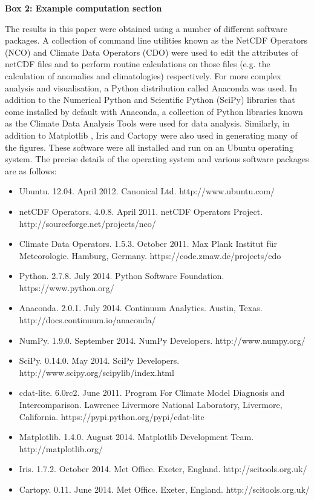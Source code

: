 \textbf{Box 2: Example computation section}

The results in this paper were obtained using a number of different software packages. A collection of command line utilities known as the NetCDF Operators (NCO) and Climate Data Operators (CDO) were used to edit the attributes of netCDF files and to perform routine calculations on those files (e.g. the calculation of anomalies and climatologies) respectively. For more complex analysis and visualisation, a Python distribution called Anaconda was used. In addition to the Numerical Python \citep[NumPy;][]{VanDerWalt2011} and Scientific Python (SciPy) libraries that come installed by default with Anaconda, a collection of Python libraries known as the Climate Data Analysis Tools \citep[CDAT;][]{Doutriaux2009} were used for data analysis. Similarly, in addition to Matplotlib \citep[the default Python plotting library;][]{Hunter2007}, Iris and Cartopy were also used in generating many of the figures. These software were all installed and run on an Ubuntu operating system. The precise details of the operating system and various software packages are as follows:
\begin{itemize}
\item Ubuntu. 12.04. April 2012. Canonical Ltd. http://www.ubuntu.com/
\item netCDF Operators. 4.0.8. April 2011. netCDF Operators Project. http://sourceforge.net/projects/nco/
\item Climate Data Operators. 1.5.3. October 2011. Max Plank Institut f{\"u}r Meteorologie. Hamburg, Germany. https://code.zmaw.de/projects/cdo
\item Python. 2.7.8. July 2014. Python Software Foundation. https://www.python.org/
\item Anaconda. 2.0.1. July 2014. Continuum Analytics. Austin, Texas. http://docs.continuum.io/anaconda/
\item NumPy. 1.9.0. September 2014. NumPy Developers. http://www.numpy.org/
\item SciPy. 0.14.0. May 2014. SciPy Developers. http://www.scipy.org/scipylib/index.html
\item cdat-lite. 6.0rc2. June 2011. Program For Climate Model Diagnosis and Intercomparison. Lawrence Livermore National Laboratory, Livermore, California. https://pypi.python.org/pypi/cdat-lite
\item Matplotlib. 1.4.0. August 2014. Matplotlib Development Team. http://matplotlib.org/
\item Iris. 1.7.2. October 2014. Met Office. Exeter, England. http://scitools.org.uk/
\item Cartopy. 0.11. June 2014. Met Office. Exeter, England. http://scitools.org.uk/
\end{itemize}

